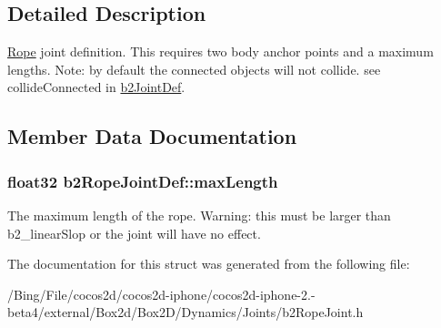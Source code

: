 \subsection{Detailed Description}
\hyperlink{class_rope}{Rope} joint definition. This requires two body anchor points and a maximum lengths. Note\-: by default the connected objects will not collide. see collide\-Connected in \hyperlink{structb2_joint_def}{b2\-Joint\-Def}. 

\subsection{Member Data Documentation}
\hypertarget{structb2_rope_joint_def_a6efdcae22e2bdcfc3aae62da1a5f0d69}{
\subsubsection[{max\-Length}]{\setlength{\rightskip}{0pt plus 5cm}float32 {\bf b2\-Rope\-Joint\-Def\-::max\-Length}}}\label{structb2_rope_joint_def_a6efdcae22e2bdcfc3aae62da1a5f0d69}
The maximum length of the rope. Warning\-: this must be larger than b2\-\_\-linear\-Slop or the joint will have no effect. 

The documentation for this struct was generated from the following file\-:\begin{DoxyCompactItemize}
\item 
/\-Bing/\-File/cocos2d/cocos2d-\/iphone/cocos2d-\/iphone-\/2.-\/beta4/external/\-Box2d/\-Box2\-D/\-Dynamics/\-Joints/b2\-Rope\-Joint.\-h\end{DoxyCompactItemize}
